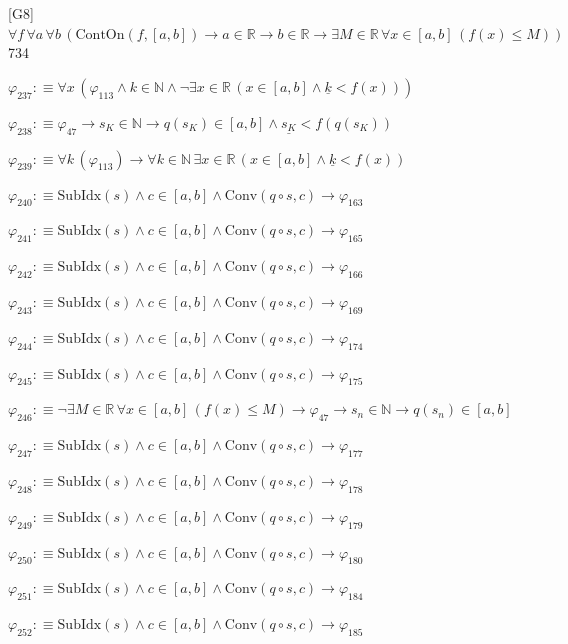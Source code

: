 \begin{fullproof}{[G8]}{$\forall f\,\forall a\,\forall b\,(\mathrm{ContOn}(f,[a,b]) \to a \in \mathbb{R} \to b \in \mathbb{R} \to \exists M \in \mathbb{R}\,\forall x \in [a,b]\,(f(x) \leq M))$}{734}
\begin{abbrevlist}
\item $\varphi_{237} :\equiv \forall x\,(\varphi_{113} \land k \in \mathbb{N} \land \neg \exists x \in \mathbb{R}\,(x \in [a,b] \land \underline{k} < f(x)))$
\item $\varphi_{238} :\equiv \varphi_{47} \to s_{K} \in \mathbb{N} \to q(s_{K}) \in [a,b] \land \underline{s_{K}} < f(q(s_{K}))$
\item $\varphi_{239} :\equiv \forall k\,(\varphi_{113}) \to \forall k \in \mathbb{N}\,\exists x \in \mathbb{R}\,(x \in [a,b] \land \underline{k} < f(x))$
\item $\varphi_{240} :\equiv \mathrm{SubIdx}(s) \land c \in [a,b] \land \mathrm{Conv}(q \circ s,c) \to \varphi_{163}$
\item $\varphi_{241} :\equiv \mathrm{SubIdx}(s) \land c \in [a,b] \land \mathrm{Conv}(q \circ s,c) \to \varphi_{165}$
\item $\varphi_{242} :\equiv \mathrm{SubIdx}(s) \land c \in [a,b] \land \mathrm{Conv}(q \circ s,c) \to \varphi_{166}$
\item $\varphi_{243} :\equiv \mathrm{SubIdx}(s) \land c \in [a,b] \land \mathrm{Conv}(q \circ s,c) \to \varphi_{169}$
\item $\varphi_{244} :\equiv \mathrm{SubIdx}(s) \land c \in [a,b] \land \mathrm{Conv}(q \circ s,c) \to \varphi_{174}$
\item $\varphi_{245} :\equiv \mathrm{SubIdx}(s) \land c \in [a,b] \land \mathrm{Conv}(q \circ s,c) \to \varphi_{175}$
\item $\varphi_{246} :\equiv \neg \exists M \in \mathbb{R}\,\forall x \in [a,b]\,(f(x) \leq M) \to \varphi_{47} \to s_{n} \in \mathbb{N} \to q(s_{n}) \in [a,b]$
\item $\varphi_{247} :\equiv \mathrm{SubIdx}(s) \land c \in [a,b] \land \mathrm{Conv}(q \circ s,c) \to \varphi_{177}$
\item $\varphi_{248} :\equiv \mathrm{SubIdx}(s) \land c \in [a,b] \land \mathrm{Conv}(q \circ s,c) \to \varphi_{178}$
\item $\varphi_{249} :\equiv \mathrm{SubIdx}(s) \land c \in [a,b] \land \mathrm{Conv}(q \circ s,c) \to \varphi_{179}$
\item $\varphi_{250} :\equiv \mathrm{SubIdx}(s) \land c \in [a,b] \land \mathrm{Conv}(q \circ s,c) \to \varphi_{180}$
\item $\varphi_{251} :\equiv \mathrm{SubIdx}(s) \land c \in [a,b] \land \mathrm{Conv}(q \circ s,c) \to \varphi_{184}$
\item $\varphi_{252} :\equiv \mathrm{SubIdx}(s) \land c \in [a,b] \land \mathrm{Conv}(q \circ s,c) \to \varphi_{185}$

\end{abbrevlist}
\end{fullproof}
